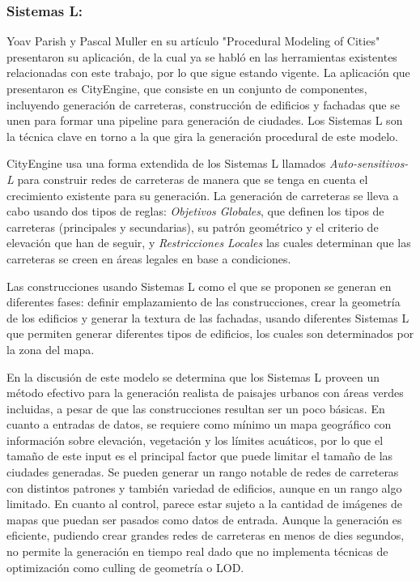         \subsubsection{Sistemas L:} Yoav Parish y Pascal Muller en su artículo "Procedural Modeling of Cities" \cite{Parish2001} presentaron su aplicación, de la cual ya se habló en las herramientas existentes relacionadas con este trabajo, por lo que sigue estando vigente. La aplicación que presentaron es CityEngine, que consiste en un conjunto de componentes, incluyendo generación de carreteras, construcción de edificios y fachadas que se unen  para formar una pipeline para generación de ciudades. Los Sistemas L son la técnica clave en torno a la que gira la generación procedural de este modelo. 
        
            CityEngine usa una forma extendida de los Sistemas L llamados \textit{Auto-sensitivos-L} para construir redes de carreteras de manera que se tenga en cuenta el crecimiento existente para su generación. La generación de carreteras se lleva a cabo usando dos tipos de reglas: \textit{Objetivos Globales}, que definen los tipos de carreteras (principales y secundarias), su patrón geométrico y el criterio de elevación que han de seguir, y \textit{Restricciones Locales} las cuales determinan que las carreteras se creen en áreas legales en base a condiciones. 

            Las construcciones usando Sistemas L como el que se proponen se generan en diferentes fases: definir emplazamiento de las construcciones, crear la geometría de los edificios y generar la textura de las fachadas, usando diferentes Sistemas L que permiten generar diferentes tipos de edificios, los cuales son determinados por la zona del mapa.

            En la discusión de este modelo se determina que los Sistemas L proveen un método efectivo para la generación realista de paisajes urbanos con áreas verdes incluidas, a pesar de que las construcciones resultan ser un poco básicas. En cuanto a entradas de datos, se requiere como mínimo un mapa geográfico con información sobre elevación, vegetación y los límites acuáticos, por lo que el tamaño de este input es el principal factor que puede limitar el tamaño de las ciudades generadas. Se pueden generar un rango notable de redes de carreteras con distintos patrones y también variedad de edificios, aunque en un rango algo limitado. En cuanto al control, parece estar sujeto a la cantidad de imágenes de mapas que puedan ser pasados como datos de entrada. Aunque la generación es eficiente, pudiendo crear grandes redes de carreteras en menos de dies segundos, no permite la generación en tiempo real dado que no implementa técnicas de optimización como culling de geometría o LOD.
        

